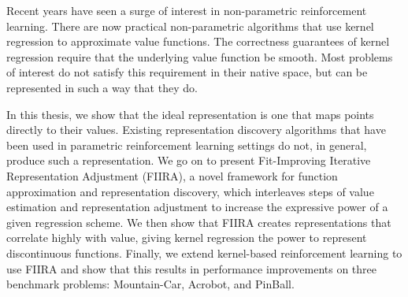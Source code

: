 % 
% 
%
Recent years have seen a surge of interest in non-parametric
reinforcement learning.
There are now practical non-parametric algorithms that use kernel regression to
approximate value functions.
The correctness guarantees of kernel regression require that the underlying
value function be smooth.
Most problems of interest do not satisfy this requirement in their native
space, but can be represented in such a way that they do.

In this thesis, we show that the ideal representation is one that maps points
directly to their values.
Existing representation discovery algorithms that have been used in parametric
reinforcement learning settings do not, in general, produce such a
representation.
We go on to present Fit-Improving Iterative Representation Adjustment
(FIIRA), a novel framework for function approximation and representation
discovery, which interleaves steps of value estimation and representation
adjustment to increase the expressive power of a given regression scheme.
We then show that FIIRA creates representations that correlate highly with
value, giving kernel regression the power to represent discontinuous functions.
Finally, we extend kernel-based reinforcement learning to use FIIRA and show
that this results in performance improvements on three
benchmark problems: Mountain-Car, Acrobot, and PinBall.
